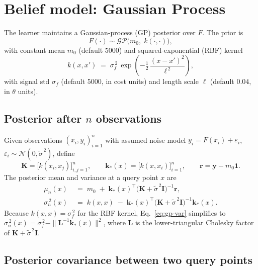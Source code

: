 \documentclass[11pt]{article}
\newcommand{\Normal}{\mathcal{N}}
\newcommand{\Cstar}{\theta}
\newcommand{\muprior}{m_0}
\newcommand{\muN}{\mu_n}
\newcommand{\sigTilde}{\tilde{\sigma}}
\begin{document}
\section{Belief model: Gaussian Process}
\label{sec:gp}

The learner maintains a Gaussian-process (GP) posterior over $F$. The prior
is
\[
  F(\cdot) \sim \mathcal{GP}\bigl(\muprior,\; k(\cdot, \cdot)\bigr),
\]
with constant mean $\muprior$ (default $5000$) and squared-exponential
(RBF) kernel
\[
  k(x, x') \;=\; \sigma_f^{\,2}\, \exp\!\left(-\tfrac{1}{2}\,\frac{(x-x')^2}{\ell^{\,2}}\right),
\]
with signal std $\sigma_f$ (default $5000$, in cost units) and length scale
$\ell$ (default $0.04$, in $\Cstar$ units).

\subsection{Posterior after \texorpdfstring{$n$}{n} observations}
\label{sec:gp:posterior}

Given observations $(x_i, y_i)_{i=1}^n$ with assumed noise model $y_i =
F(x_i) + \varepsilon_i$, $\varepsilon_i \sim \Normal(0, \sigTilde^{\,2})$,
define
\[
  \mathbf{K} = \bigl[k(x_i, x_j)\bigr]_{i,j=1}^n, \qquad
  \mathbf{k}_*(x) = \bigl[k(x, x_i)\bigr]_{i=1}^n, \qquad
  \mathbf{r} = \mathbf{y} - \muprior \mathbf{1}.
\]
The posterior mean and variance at a query point $x$ are
\begin{align}
  \muN(x)      &\;=\; \muprior \;+\; \mathbf{k}_*(x)^{\!\top}\bigl(\mathbf{K} + \sigTilde^{\,2}\mathbf{I}\bigr)^{-1} \mathbf{r},
  \label{eq:gp-mean} \\[2pt]
  \sigma_n^{\,2}(x) &\;=\; k(x, x) \;-\; \mathbf{k}_*(x)^{\!\top}\bigl(\mathbf{K} + \sigTilde^{\,2}\mathbf{I}\bigr)^{-1} \mathbf{k}_*(x).
  \label{eq:gp-var}
\end{align}
Because $k(x, x) = \sigma_f^{\,2}$ for the RBF kernel,
Eq.~\eqref{eq:gp-var} simplifies to
$\sigma_n^{\,2}(x) = \sigma_f^{\,2} - \|\mathbf{L}^{-1}\mathbf{k}_*(x)\|^2$,
where $\mathbf{L}$ is the lower-triangular Cholesky factor of
$\mathbf{K} + \sigTilde^{\,2}\mathbf{I}$.

\subsection{Posterior covariance between two query points}
\label{sec:gp:covmat}
\end{document}
